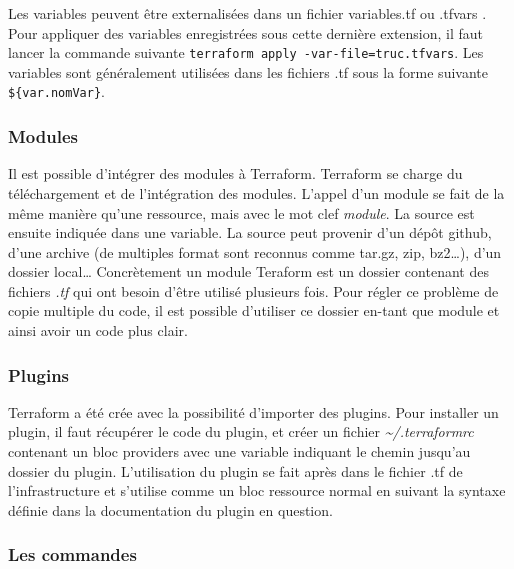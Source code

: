 \documentclass[]{article}
\begin{document}
Les variables peuvent être externalisées dans un fichier
\og variables.tf \fg ou \og
.tfvars \fg. Pour appliquer des variables enregistrées
sous cette dernière extension, il faut lancer la commande suivante
\texttt{terraform\ apply\ -var-file=truc.tfvars}. Les variables sont
généralement utilisées dans les fichiers .tf sous la forme suivante
\texttt{\$\{var.nomVar\}}.

\subsubsection{Modules}\label{modules}

Il est possible d'intégrer des modules à Terraform. Terraform se charge
du téléchargement et de l'intégration des modules. L'appel d'un module
se fait de la même manière qu'une ressource, mais avec le mot clef
\emph{module}. La source est ensuite indiquée dans une variable. La
source peut provenir d'un dépôt github, d'une archive (de multiples
format sont reconnus comme tar.gz, zip, bz2\ldots{}), d'un dossier
local\ldots{} Concrètement un module Teraform est un dossier contenant
des fichiers \emph{.tf} qui ont besoin d'être utilisé plusieurs fois.
Pour régler ce problème de copie multiple du code, il est possible
d'utiliser ce dossier en-tant que module et ainsi avoir un code plus
clair.

\subsubsection{Plugins}\label{plugins}

Terraform a été crée avec la possibilité d'importer des plugins. Pour
installer un plugin, il faut récupérer le code du plugin, et créer un
fichier \emph{\textasciitilde{}/.terraformrc} contenant un bloc
providers avec une variable indiquant le chemin jusqu'au dossier du
plugin. L'utilisation du plugin se fait après dans le fichier .tf de
l’infrastructure et s'utilise comme un bloc ressource normal en suivant
la syntaxe définie dans la documentation du plugin en question.

\subsubsection{Les commandes}\label{les-commandes}
\end{document}

